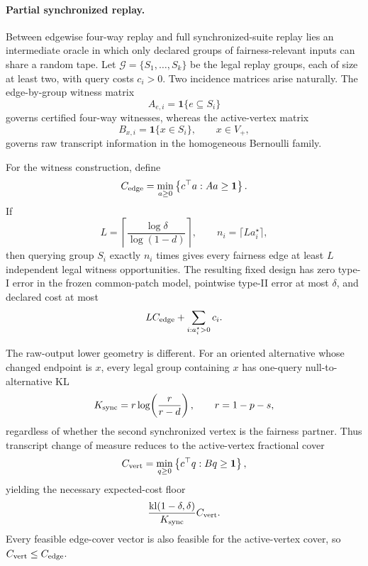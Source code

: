 \paragraph{Partial synchronized replay.}
Between edgewise four-way replay and full synchronized-suite replay lies an
intermediate oracle in which only declared groups of fairness-relevant inputs can
share a random tape.  Let $\mathcal G=\{S_1,\ldots,S_k\}$ be the legal replay
groups, each of size at least two, with query costs $c_i>0$.  Two incidence
matrices arise naturally.  The edge-by-group witness matrix
\begin{equation}\label{eq:appendix-07-open-problems-001}
A_{e,i}=\mathbf{1}\{e\subseteq S_i\}
\end{equation}
governs certified four-way witnesses, whereas the active-vertex matrix
\begin{equation}\label{eq:appendix-07-open-problems-002}
B_{x,i}=\mathbf{1}\{x\in S_i\},
\qquad x\in V_+,
\end{equation}
governs raw transcript information in the homogeneous Bernoulli family.

For the witness construction, define
\begin{equation}\label{eq:appendix-07-open-problems-003}
C_{\rm edge}
=
\min_{a\ge0}
\left\{
c^\top a: Aa\ge\mathbf{1}
\right\}.
\end{equation}
If
\begin{equation}\label{eq:appendix-07-open-problems-004}
L=
\left\lceil
\frac{\log\delta}{\log(1-d)}
\right\rceil,
\qquad
n_i=\lceil L a_i^\star\rceil,
\end{equation}
then querying group $S_i$ exactly $n_i$ times gives every fairness edge at least
$L$ independent legal witness opportunities.  The resulting fixed design has
zero type-I error in the frozen common-patch model, pointwise type-II error at
most $\delta$, and declared cost at most
\begin{equation}\label{eq:appendix-07-open-problems-005}
L C_{\rm edge}
+
\sum_{i:a_i^\star>0} c_i.
\end{equation}

The raw-output lower geometry is different.  For an oriented alternative whose
changed endpoint is $x$, every legal group containing $x$ has one-query
null-to-alternative KL
\begin{equation}\label{eq:appendix-07-open-problems-006}
K_{\rm sync}
=
r\log\!\left(\frac r{r-d}\right),
\qquad r=1-p-s,
\end{equation}
regardless of whether the second synchronized vertex is the fairness partner.
Thus transcript change of measure reduces to the active-vertex fractional cover
\begin{equation}\label{eq:appendix-07-open-problems-007}
C_{\rm vert}
=
\min_{q\ge0}
\left\{
c^\top q:Bq\ge\mathbf{1}
\right\},
\end{equation}
yielding the necessary expected-cost floor
\begin{equation}\label{eq:appendix-07-open-problems-008}
\frac{\mathrm{kl}(1-\delta,\delta)}{K_{\rm sync}}C_{\rm vert}.
\end{equation}
Every feasible edge-cover vector is also feasible for the active-vertex cover,
so $C_{\rm vert}\le C_{\rm edge}$.

